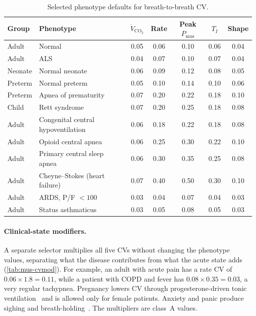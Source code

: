\begin{table}[htbp]\centering\small
\caption{Selected phenotype defaults for breath-to-breath CV.}
\label{tab:mus-cvdef}
\begin{tabular}{@{}llccccc@{}}\toprule
Group & Phenotype & $\dot V_{\mathrm{CO_2}}$ & Rate & Peak $P_{\mathrm{mus}}$ & $T_I$ & Shape\\\midrule
Adult & Normal & 0.05 & 0.06 & 0.10 & 0.06 & 0.04\\
Adult & ALS & 0.04 & 0.07 & 0.10 & 0.07 & 0.04\\
Neonate & Normal neonate & 0.06 & 0.09 & 0.12 & 0.08 & 0.05\\
Preterm & Normal preterm & 0.05 & 0.10 & 0.14 & 0.10 & 0.06\\
Preterm & Apnea of prematurity & 0.07 & 0.20 & 0.22 & 0.18 & 0.10\\
Child & Rett syndrome & 0.07 & 0.20 & 0.25 & 0.18 & 0.08\\
Adult & Congenital central hypoventilation & 0.06 & 0.18 & 0.22 & 0.18 & 0.08\\
Adult & Opioid central apnea & 0.06 & 0.25 & 0.30 & 0.22 & 0.10\\
Adult & Primary central sleep apnea & 0.06 & 0.30 & 0.35 & 0.25 & 0.08\\
Adult & Cheyne--Stokes (heart failure) & 0.07 & 0.40 & 0.50 & 0.30 & 0.10\\
Adult & ARDS, P/F $<100$ & 0.03 & 0.04 & 0.07 & 0.04 & 0.03\\
Adult & Status asthmaticus & 0.03 & 0.05 & 0.08 & 0.05 & 0.03\\\bottomrule
\end{tabular}
\end{table}

\paragraph{Clinical-state modifiers.} A separate selector multiplies all five CVs without changing the phenotype values, separating what the disease contributes from what the acute state adds (\cref{tab:mus-cvmod}). For example, an adult with acute pain has a rate CV of $0.06\times1.8=0.11$, while a patient with COPD and fever has $0.08\times0.35=0.03$, a very regular tachypnea. Pregnancy lowers CV through progesterone-driven tonic ventilation~\citep{skatrud1978} and is allowed only for female patients. Anxiety and panic produce sighing and breath-holding~\citep{ley1985}. The multipliers are class~A values.

